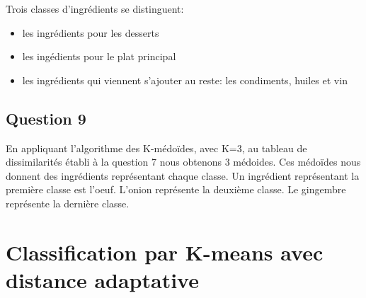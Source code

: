 \documentclass[a4paper,11pt,oneside,roman]{article}
\begin{document}
    Trois classes d'ingrédients se distinguent:
    \begin{itemize}
        \item les ingrédients pour les desserts
        \item les ingédients pour le plat principal
        \item les ingrédients qui viennent s'ajouter au reste: les condiments, huiles et vin
    \end{itemize}

    \subsection*{Question 9}

    En appliquant l'algorithme des K-médoïdes, avec K=3, au tableau de dissimilarités établi à la question 7 nous obtenons 3 médoides.
    Ces médoïdes nous donnent des ingrédients représentant chaque classe.
    Un ingrédient représentant la première classe est l'oeuf.
    L'onion représente la deuxième classe. Le gingembre représente la dernière classe.

    \section{Classification par K-means avec distance adaptative}
\end{document}
